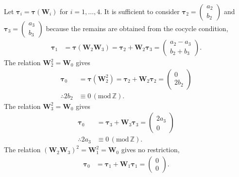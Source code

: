 Let $\bm{\tau}_{i} = \bm{\tau}(\bm{W}_{i})$ for $i = 1, \dots, 4$.
It is sufficient to consider $\bm{\tau}_{2} = \begin{pmatrix} a_{2} \\ b_{2} \end{pmatrix}$ and $\bm{\tau}_{3} = \begin{pmatrix} a_{3} \\ b_{3} \end{pmatrix}$ because the remains are obtained from the cocycle condition,
\begin{align*}
  \bm{\tau}_{1}
    &= \bm{\tau}(\bm{W}_{2}\bm{W}_{3})
    = \bm{\tau}_{2} + \bm{W}_{2} \bm{\tau}_{3}
    = \begin{pmatrix} a_{2} - a_{3} \\ b_{2} + b_{3} \end{pmatrix}.
\end{align*}
The relation $\bm{W}_{2}^{2} = \bm{W}_{0}$ gives
\begin{align*}
  \bm{\tau}_{0}
    &= \bm{\tau}(\bm{W}_{2}^{2})
    = \bm{\tau}_{2} + \bm{W}_{2} \bm{\tau}_{2}
    = \begin{pmatrix} 0 \\ 2 b_{2} \end{pmatrix} \\
  \therefore 2b_{2} &\equiv 0 \, (\mathrm{mod}\, \mathbb{Z}).
\end{align*}
The relation $\bm{W}_{3}^{2} = \bm{W}_{0}$ gives
\begin{align*}
  \bm{\tau}_{0}
    &= \bm{\tau}_{3} + \bm{W}_{3} \bm{\tau}_{3}
    = \begin{pmatrix} 2 a_{3} \\ 0 \end{pmatrix} \\
  \therefore 2 a_{3} &\equiv 0 \, (\mathrm{mod}\, \mathbb{Z}).
\end{align*}
The relation $(\bm{W}_{2}\bm{W}_{3})^{2} = \bm{W}_{1}^{2} = \bm{W}_{0}$ gives no restriction,
\begin{align*}
  \bm{\tau}_{0}
    &= \bm{\tau}_{1} + \bm{W}_{1} \bm{\tau}_{1}
    = \begin{pmatrix} 0 \\ 0 \end{pmatrix}.
\end{align*}

